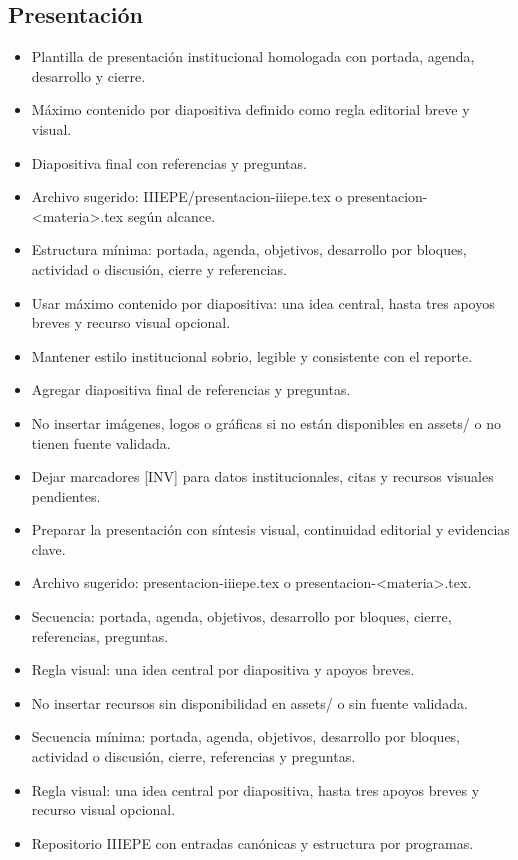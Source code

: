 \documentclass[12pt]{article}
\begin{document}
\subsection*{Presentación}
\begin{itemize}[leftmargin=*]
  \item Plantilla de presentación institucional homologada con portada, agenda, desarrollo y cierre.
  \item Máximo contenido por diapositiva definido como regla editorial breve y visual.
  \item Diapositiva final con referencias y preguntas.
  \item Archivo sugerido: IIIEPE/presentacion-iiiepe.tex o presentacion-<materia>.tex según alcance.
  \item Estructura mínima: portada, agenda, objetivos, desarrollo por bloques, actividad o discusión, cierre y referencias.
  \item Usar máximo contenido por diapositiva: una idea central, hasta tres apoyos breves y recurso visual opcional.
  \item Mantener estilo institucional sobrio, legible y consistente con el reporte.
  \item Agregar diapositiva final de referencias y preguntas.
  \item No insertar imágenes, logos o gráficas si no están disponibles en assets/ o no tienen fuente validada.
  \item Dejar marcadores [INV] para datos institucionales, citas y recursos visuales pendientes.
  \item Preparar la presentación con síntesis visual, continuidad editorial y evidencias clave.
  \item Archivo sugerido: presentacion-iiiepe.tex o presentacion-<materia>.tex.
  \item Secuencia: portada, agenda, objetivos, desarrollo por bloques, cierre, referencias, preguntas.
  \item Regla visual: una idea central por diapositiva y apoyos breves.
  \item No insertar recursos sin disponibilidad en assets/ o sin fuente validada.
  \item Secuencia mínima: portada, agenda, objetivos, desarrollo por bloques, actividad o discusión, cierre, referencias y preguntas.
  \item Regla visual: una idea central por diapositiva, hasta tres apoyos breves y recurso visual opcional.
  \item Repositorio IIIEPE con entradas canónicas y estructura por programas.

\end{itemize}
\end{document}
